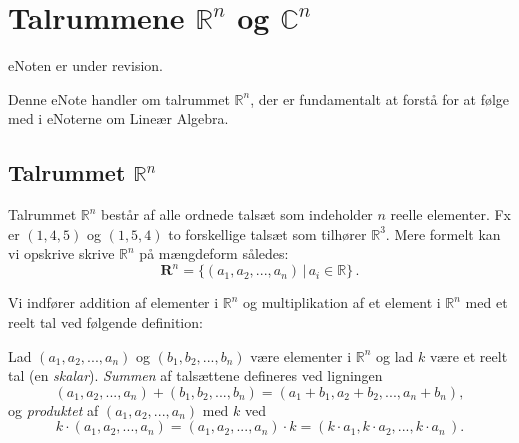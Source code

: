 
\setcounter{chapter}{0} %

\chapter{Talrummene $\mathbb R^n $ og $\mathbb C^n $} \label{tn1}

eNoten er under revision.

 

\begin{basis}
Denne eNote handler om talrummet $\mathbb R^n $, der er fundamentalt at forstå for at følge med i eNoterne om Lineær Algebra.
\end{basis}

\section{Talrummet $\mathbb R^n $}

Talrummet $\mathbb R ^n$ består af alle ordnede talsæt som indeholder $n$ reelle elementer. Fx er $(1,4,5)$ og $(1,5,4)$ to forskellige talsæt som tilhører $\mathbb R ^3$. Mere formelt kan vi opskrive skrive $\mathbb R ^n$ på mængdeform således:
\begin{equation}\label{eqRn}
\mathbf R ^n=\{(a_1,a_2,...,a_n)\,|\,a_i \in \mathbb R\}\,.
\end{equation}

Vi indfører addition af elementer i $\mathbb R ^n$ og multiplikation af et element i $\mathbb R ^n$ med et reelt tal ved følgende definition:

\begin{definition}\label{tn1.defRegneOP}
Lad $(a_1,a_2,...,a_n)$ og $(b_1,b_2,...,b_n)$ være elementer i $\mathbb R ^n$ og lad $k$ være et reelt tal (en \emph{skalar}).
\textit{Summen} af talsættene defineres ved ligningen
\begin{equation}\label{eqRnSum}
(a_1,a_2,...,a_n)+(b_1,b_2,...,b_n)=(a_1+b_1,a_2+b_2,...,a_n+b_n),
\end{equation}
og \textit{produktet} af $(a_1,a_2,...,a_n)$ med $k$ ved
\begin{equation}\label{eqRnMult}
k\cdot(a_1,a_2,...,a_n)=(a_1,a_2,...,a_n)\cdot k=(k\cdot a_1,k\cdot a_2,...,k\cdot a_n\,).
\end{equation}
\end{definition}


